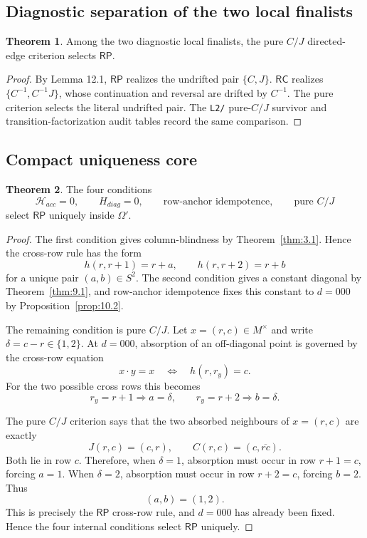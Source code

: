 \documentclass[11pt]{article}
\theoremstyle{definition}
\newtheorem{theorem}{Theorem}[section]
\newcommand{\RP}{\mathsf{RP}}
\newcommand{\RC}{\mathsf{RC}}
\begin{document}
\subsection{Diagnostic separation of the two local
finalists}\label{final-selector-among-the-two-local-finalists}

\begin{theorem}
\label{thm:12.2}
Among the two diagnostic local finalists, the pure \(C/J\)
directed-edge criterion selects \(\RP\).
\end{theorem}

\begin{proof}
By Lemma 12.1, \(\RP\) realizes the undrifted pair
\(\{C,J\}\). \(\RC\) realizes \(\{C^{-1},C^{-1}J\}\), whose
continuation and reversal are drifted by \(C^{-1}\). The pure criterion
selects the literal undrifted pair. The \texttt{L2/} pure-\(C/J\) survivor and transition-factorization
audit tables record the same comparison.
\end{proof}

\subsection{Compact uniqueness core}\label{compact-uniqueness-core}

\begin{theorem}
\label{thm:12.3}
The four conditions \[
\mathcal H_{acc}=0,
\qquad
H_{diag}=0,
\qquad
\text{row-anchor idempotence},
\qquad
\text{pure }C/J
\] select \(\RP\) uniquely inside \(\Omega'\).
\end{theorem}

\begin{proof}
The first condition gives column-blindness by Theorem~\ref{thm:3.1}.
Hence the cross-row rule has the form \[
h(r,r+1)=r+a,
\qquad
h(r,r+2)=r+b
\] for a unique pair \((a,b)\in S^2\). The second condition gives a constant diagonal by
Theorem~\ref{thm:9.1}, and row-anchor idempotence fixes this constant to
\(d=000\) by Proposition~\ref{prop:10.2}.

The remaining condition is pure \(C/J\). Let \(x=(r,c)\in M^\times\)
and write
\(\delta=c-r\in\{1,2\}\). At \(d=000\), absorption of an off-diagonal
point is governed by the cross-row equation \[
x\cdot y=x
\quad\Longleftrightarrow\quad
h(r,r_y)=c.
\] For the two possible cross rows this becomes \[
r_y=r+1\Rightarrow a=\delta,
\qquad
r_y=r+2\Rightarrow b=\delta.
\]

The pure \(C/J\) criterion says that the two absorbed neighbours of
\(x=(r,c)\) are exactly \[
J(r,c)=(c,r),
\qquad
C(r,c)=(c,\overline{rc}).
\] Both lie in row \(c\). Therefore, when \(\delta=1\), absorption must
occur in row \(r+1=c\), forcing \(a=1\). When \(\delta=2\), absorption
must occur in row \(r+2=c\), forcing \(b=2\). Thus \[
(a,b)=(1,2).
\] This is precisely the \(\RP\) cross-row rule, and \(d=000\) has already
been fixed. Hence the four internal conditions select \(\RP\) uniquely.
\end{proof}
\end{document}
